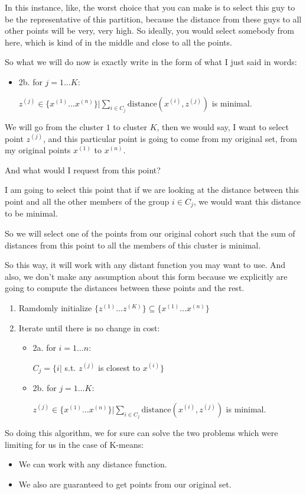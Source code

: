 \documentclass[a4paper, 12pt]{article}
\begin{document}
In this instance, like, the worst choice that you can make is to select this guy
to be the representative of this partition, because the distance from these guys
to all other points will be very, very high. So ideally, you would select
somebody from here, which is kind of in the middle and close to all the points.

So what we will do now is exactly write in the form of what I just said in
words:

\begin{itemize}
\item 2b. for \(j=1 \ldots K\):

\(z^{(j)} \in \{x^{(1)} \ldots x^{(n)}\} | \sum_{i \in C_j} \text{distance}(x^{(i)}, z^{(j)})\) is minimal.
\end{itemize}

We will go from the cluster \(1\) to cluster \(K\), then we would say, I want to
select point \(z^{(j)}\), and this particular point is going to come from my
original set, from my original points \(x^{(1)}\) to \(x^{(n)}\).

And what would I request from this point?

I am going to select this point that if we are looking at the distance between
this point and all the other members of the group \(i \in C_j\), we would want
this distance to be minimal.

So we will select one of the points from our original cohort such that the sum
of distances from this point to all the members of this cluster is minimal.

So this way, it will work with any distant function you may want to use. And
also, we don't make any assumption about this form because we explicitly are
going to compute the distances between these points and the rest.

\begin{enumerate}
\item Ramdomly initialize \(\{z^{(1)} \ldots z^{(K)}\} \subseteq \{x^{(1)} \ldots x^{(n)}\}\)
\item Iterate until there is no change in cost:
\begin{itemize}
\item 2a. for \(i=1 \ldots n\):

\(C_j = \{i|\) s.t. \(z^{(j)}\) is closest to \(x^{(i)}\}\)

\item 2b. for \(j=1 \ldots K\):

\(z^{(j)} \in \{x^{(1)} \ldots x^{(n)}\} | \sum_{i \in C_j} \text{distance}(x^{(i)}, z^{(j)})\) is minimal.
\end{itemize}
\end{enumerate}

So doing this algorithm, we for sure can solve the two problems which were
limiting for us in the case of K-means:

\begin{itemize}
\item We can work with any distance function.
\item We also are guaranteed to get points from our original set.
\end{itemize}
\end{document}
